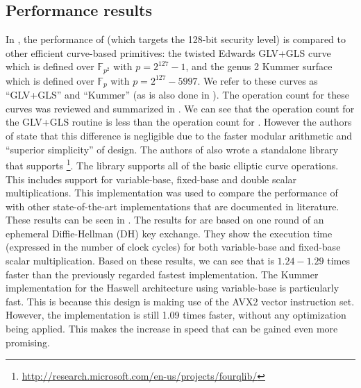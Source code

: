 \subsection{Performance results}
In \cite[§6]{costello2015fourq}, the performance of {\fourq} (which targets the 128-bit security level) is compared to other efficient curve-based primitives: the twisted Edwards GLV+GLS curve \cite{longa2014four} which is defined over $\mathbb{F}_{p^2}$ with $p = 2^{127} - 1$, and the genus 2 Kummer surface \cite{gaudry2012genus} which is defined over $\mathbb{F}_p$ with $p = 2^{127} - 5997$.
We refer to these curves as ``GLV+GLS'' and ``Kummer'' (as is also done in \cite{costello2015fourq}).
The operation count for these curves was reviewed and summarized in \cite[§6.1]{costello2015fourq}.
We can see that the operation count for the GLV+GLS routine is less than the operation count for {\fourq}.
However the authors of {\fourq} state that this difference is negligible due to the faster modular arithmetic and ``superior simplicity'' of {\fourqs} design.
The authors of {\fourq} also wrote a standalone library that supports {\fourq}%
\footnote{\url{http://research.microsoft.com/en-us/projects/fourqlib/}}.
The library supports all of the basic elliptic curve operations.
This includes support for variable-base, fixed-base and double scalar multiplications.
This implementation was used to compare the performance of {\fourq} with other state-of-the-art implementations that are documented in literature.
These results can be seen in \cite[§6.2]{costello2015fourq}.
The results for {\fourq} are based on one round of an ephemeral Diffie-Hellman (DH) key exchange.
They show the execution time (expressed in the number of clock cycles) for both variable-base and fixed-base scalar multiplication.
Based on these results, we can see that {\fourq} is $1.24 - 1.29$ times faster than the previously regarded fastest implementation.
The Kummer implementation for the Haswell architecture using variable-base is particularly fast.
This is because this design is making use of the AVX2 vector instruction set.
However, the {\fourq} implementation is still 1.09 times faster, without any optimization being applied.
This makes the increase in speed that can be gained even more promising.


